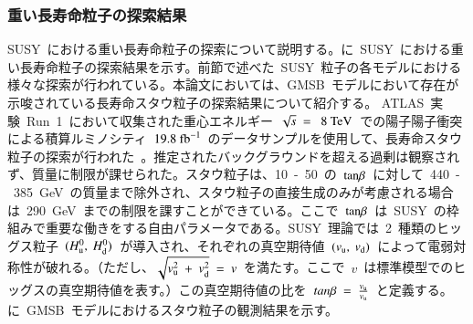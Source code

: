 \subsubsection{重い長寿命粒子の探索結果}
SUSY~における重い長寿命粒子の探索について説明する。に~SUSY~における重い長寿命粒子の探索結果を示す。前節で述べた~SUSY~粒子の各モデルにおける様々な探索が行われている。本論文においては、GMSB~モデルにおいて存在が示唆されている長寿命スタウ粒子の探索結果について紹介する。
ATLAS~実験~Run~1~において収集された重心エネルギー~$\sqrt{s}~=~~8~\rm{TeV}$~での陽子陽子衝突による積算ルミノシティ~$19.8~\rm{fb}^{-1}$~のデータサンプルを使用して、長寿命スタウ粒子の探索が行われた~\cite{AR:03}。推定されたバックグラウンドを超える過剰は観察されず、質量に制限が課せられた。スタウ粒子は、10~-~50~の~$\rm{tan}\beta$~に対して~440~-~385~GeV~の質量まで除外され、スタウ粒子の直接生成のみが考慮される場合は~290~GeV~までの制限を課すことができている。ここで~$\rm{tan}\beta$~は~SUSY~の枠組みで重要な働きをする自由パラメータである。SUSY~理論では~2~種類のヒッグス粒子~$(H_{\rm{u}}^0,~H_{\rm{d}}^0)$~が導入され、それぞれの真空期待値~$(v_{\rm{u}},~v_{\rm{d}})$~によって電弱対称性が破れる。（ただし、$\sqrt{v_{\rm{u}}^2~+~v_{\rm{d}}^2}~=~v$~を満たす。ここで~$v$~は標準模型でのヒッグスの真空期待値を表す。）この真空期待値の比を~$tan\beta~=~\frac{v_{\rm{u}}}{v_{\rm{u}}}$~と定義する。に~GMSB~モデルにおけるスタウ粒子の観測結果を示す。

